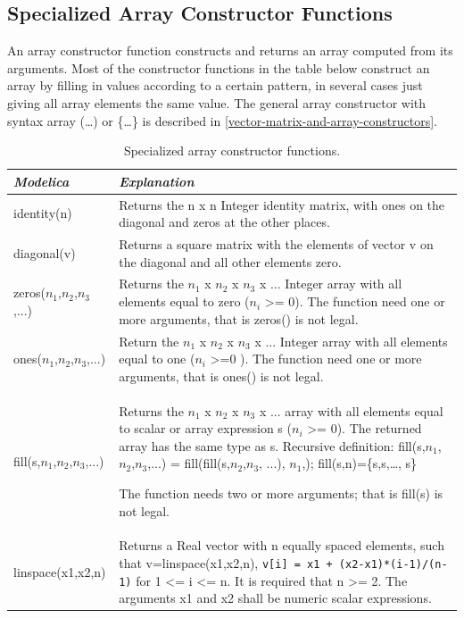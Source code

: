 \documentclass[10pt,a4paper]{report}
\def\doublelabel#1{\label{#1}\hypertarget{#1}{}}
\begin{document}
\subsection{Specialized Array Constructor Functions}\doublelabel{specialized-array-constructor-functions}

An array constructor function constructs and returns an array computed
from its arguments. Most of the constructor functions in the table below
construct an array by filling in values according to a certain pattern,
in several cases just giving all array elements the same value. The
general array constructor with syntax array (\ldots{}) or \{\ldots{}\}
is described in \ref{vector-matrix-and-array-constructors}.

\begin{longtable}[]{|l|p{9cm}|}
\caption{Specialized array constructor functions.}\\
\hline
\emph{Modelica} & \emph{Explanation}\\ \hline
\endhead
identity(n)
&
Returns the n x n Integer identity matrix, with ones on the diagonal and
zeros at the other places.\\ \hline
diagonal(v)
&
Returns a square matrix with the elements of vector v on the diagonal
and all other elements zero.\\ \hline
zeros($n_1$,$n_2$,$n_3$,...) &
Returns the $n_1$ x $n_2$ x $n_3$ x ... Integer array with all elements equal to zero ($n_i$
\textgreater{}= 0). The function need one or more arguments, that is
zeros() is not legal.\\ \hline
ones($n_1$,$n_2$,$n_3$,...) &
Return the $n_1$ x $n_2$ x $n_3$ x ... Integer array with all elements equal to one ($n_i$
\textgreater{}=0 ). The function need one or more arguments, that is
ones() is not legal.\\ \hline
fill(s,$n_1$,$n_2$,$n_3$,...) &
Returns the $n_1$ x $n_2$ x $n_3$ x ... array with all elements equal to scalar or array expression s
($n_i$ \textgreater{}= 0). The returned array has the same
type as s.
Recursive definition:
fill(s,$n_1$,$n_2$,$n_3$,...) =
fill(fill(s,$n_2$,$n_3$, ...),
$n_1$,); fill(s,n)=\{s,s,\ldots{}, s\}

The function needs two or more arguments; that is fill(s) is not
legal.\\ \hline
linspace(x1,x2,n)
&
Returns a Real vector with n equally spaced elements, such that
v=linspace(x1,x2,n),\newline
\lstinline!v[i] = x1 + (x2-x1)*(i-1)/(n-1)! for 1 <= i <= n.
It is required that n \textgreater{}= 2. The arguments x1 and x2 shall
be numeric scalar expressions.\\ \hline
\end{longtable}
\end{document}
